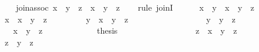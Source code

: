 \begin{isabellebody}
\isanewline
\isanewline
\ \ \isamarkupfalse%
\ join{\isacharunderscore}assoc{\isacharcolon}\ {\isachardoublequoteopen}{\isacharparenleft}x\ {\isasymsqunion}\ y{\isacharparenright}\ {\isasymsqunion}\ z\ {\isacharequal}\ x\ {\isasymsqunion}\ {\isacharparenleft}y\ {\isasymsqunion}\ z{\isacharparenright}{\isachardoublequoteclose}\isanewline
\ \ \isamarkupfalse%
\ {\isacharparenleft}rule\ joinI{\isacharparenright}\isanewline
\ \ \ \ \isamarkupfalse%
\ {\isachardoublequoteopen}x\ {\isasymsqunion}\ y\ {\isasymsqsubseteq}\ x\ {\isasymsqunion}\ {\isacharparenleft}y\ {\isasymsqunion}\ z{\isacharparenright}{\isachardoublequoteclose}\isanewline
\ \ \ \ \isamarkupfalse%
\isanewline
\ \ \ \ \ \ \isamarkupfalse%
\ {\isachardoublequoteopen}x\ {\isasymsqsubseteq}\ x\ {\isasymsqunion}\ {\isacharparenleft}y\ {\isasymsqunion}\ z{\isacharparenright}{\isachardoublequoteclose}\ \isacommand{{\isachardot}{\isachardot}}\isamarkupfalse%
\isanewline
\ \ \ \ \ \ \isamarkupfalse%
\ {\isachardoublequoteopen}y\ {\isasymsqsubseteq}\ x\ {\isasymsqunion}\ {\isacharparenleft}y\ {\isasymsqunion}\ z{\isacharparenright}{\isachardoublequoteclose}\isanewline
\ \ \ \ \ \ \isamarkupfalse%
\ {\isacharminus}\isanewline
\ \ \ \ \ \ \ \ \isamarkupfalse%
\ {\isachardoublequoteopen}y\ {\isasymsqsubseteq}\ y\ {\isasymsqunion}\ z{\isachardoublequoteclose}\ \isacommand{{\isachardot}{\isachardot}}\isamarkupfalse%
\isanewline
\ \ \ \ \ \ \ \ \isamarkupfalse%
\ \isamarkupfalse%
\ {\isachardoublequoteopen}{\isachardot}{\isachardot}{\isachardot}\ {\isasymsqsubseteq}\ x\ {\isasymsqunion}\ {\isacharparenleft}y\ {\isasymsqunion}\ z{\isacharparenright}{\isachardoublequoteclose}\ \isacommand{{\isachardot}{\isachardot}}\isamarkupfalse%
\isanewline
\ \ \ \ \ \ \ \ \isamarkupfalse%
\ \isamarkupfalse%
\ {\isacharquery}thesis\ \isacommand{{\isachardot}}\isamarkupfalse%
\isanewline
\ \ \ \ \ \ \isamarkupfalse%
\isanewline
\ \ \ \ \isamarkupfalse%
\isanewline
\ \ \ \ \isamarkupfalse%
\ {\isachardoublequoteopen}z\ {\isasymsqsubseteq}\ x\ {\isasymsqunion}\ {\isacharparenleft}y\ {\isasymsqunion}\ z{\isacharparenright}{\isachardoublequoteclose}\isanewline
\ \ \ \ \isamarkupfalse%
\ {\isacharminus}\isanewline
\ \ \ \ \ \ \isamarkupfalse%
\ {\isachardoublequoteopen}z\ {\isasymsqsubseteq}\ y\ {\isasymsqunion}\ z{\isachardoublequoteclose}\ \ \isacommand{{\isachardot}{\isachardot}}\isamarkupfalse%

\end{isabellebody}
